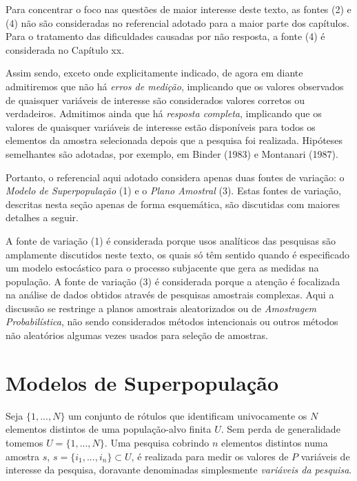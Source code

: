 \documentclass[
  12pt,
  brazilian,
]{book}
\theoremstyle{definition}
\theoremstyle{definition}
\theoremstyle{definition}
\theoremstyle{definition}
\theoremstyle{remark}
\begin{document}
Para concentrar o foco nas questões de maior interesse deste texto, as fontes
(2) e (4) não são consideradas no referencial adotado para a maior parte dos
capítulos. Para o tratamento das dificuldades causadas por não resposta, a fonte
(4) é considerada no Capítulo xx.

Assim sendo, exceto onde explicitamente indicado, de agora em diante admitiremos que não há \emph{erros de medição}, implicando que os valores observados de quaisquer variáveis de interesse são considerados valores corretos ou verdadeiros. Admitimos ainda que há \emph{resposta completa}, implicando que os valores de quaisquer variáveis de interesse estão disponíveis para todos os elementos da amostra selecionada depois que a pesquisa foi realizada. Hipóteses semelhantes são adotadas, por exemplo, em Binder (1983) e Montanari (1987).

Portanto, o referencial aqui adotado considera apenas duas fontes de variação: o \emph{Modelo de Superpopulação} (1) e o \emph{Plano Amostral} (3). Estas fontes de variação, descritas nesta seção apenas de forma esquemática, são discutidas com maiores detalhes a seguir.

A fonte de variação (1) é considerada porque usos analíticos das pesquisas
são amplamente discutidos neste texto, os quais só têm sentido quando é
especificado um modelo estocástico para o processo subjacente que gera as
medidas na população. A fonte de variação (3) é considerada porque a atenção
é focalizada na análise de dados obtidos através de pesquisas amostrais
complexas. Aqui a discussão se restringe a planos amostrais aleatorizados ou
de \emph{Amostragem Probabilística}, não sendo considerados métodos intencionais ou
outros métodos não aleatórios algumas vezes usados para seleção de amostras.

\hypertarget{modelos-de-superpopulauxe7uxe3o}{%
\section{Modelos de Superpopulação}\label{modelos-de-superpopulauxe7uxe3o}}

Seja \(\{1, ..., N\}\) um conjunto de rótulos que identificam univocamente os \(N\)
elementos distintos de uma população-alvo finita \(U\). Sem perda de generalidade
tomemos \(U=\{1,...,N\}\). Uma pesquisa cobrindo \(n\) elementos distintos numa
amostra \(s\), \(s=\{i_{1},...,i_{n}\} \subset U\), é realizada para medir os valores
de \(P\) variáveis de interesse da pesquisa, doravante denominadas simplesmente
\emph{variáveis da pesquisa}.
\end{document}
